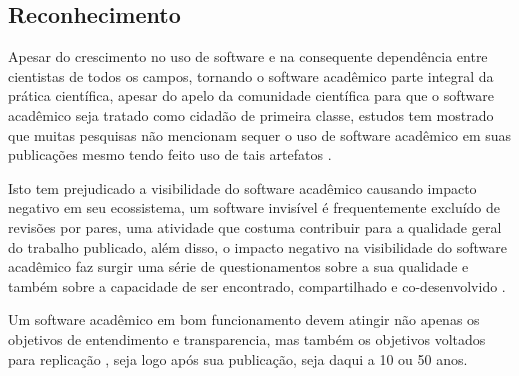 \subsection{Reconhecimento}


Apesar do crescimento no uso de software e na consequente dependência entre
cientistas de todos os campos, tornando o software acadêmico parte integral da
prática científica, apesar do apelo da comunidade científica para que o
software acadêmico seja tratado como cidadão de primeira classe, estudos tem
mostrado que muitas pesquisas não mencionam sequer o uso de software acadêmico
em suas publicações mesmo tendo feito uso de tais artefatos
\cite{momcheva2015software} \cite{howison2016software}.

Isto tem prejudicado a visibilidade do software acadêmico causando impacto
negativo em seu ecossistema, um software invisível é frequentemente excluído de
revisões por pares, uma atividade que costuma contribuir para a qualidade geral
do trabalho publicado, além disso, o
impacto negativo na visibilidade do software acadêmico faz surgir uma
série de questionamentos sobre a sua qualidade e também sobre a
capacidade de ser encontrado, compartilhado e co-desenvolvido
\cite{howison2013, katz2014transitive} \cite{howison2016software}.

Um software acadêmico em bom funcionamento devem atingir não apenas os
objetivos de entendimento e transparencia, mas também os objetivos voltados
para replicação \cite{Stodden2010}, seja logo após sua publicação, seja daqui
a 10 ou 50 anos.






